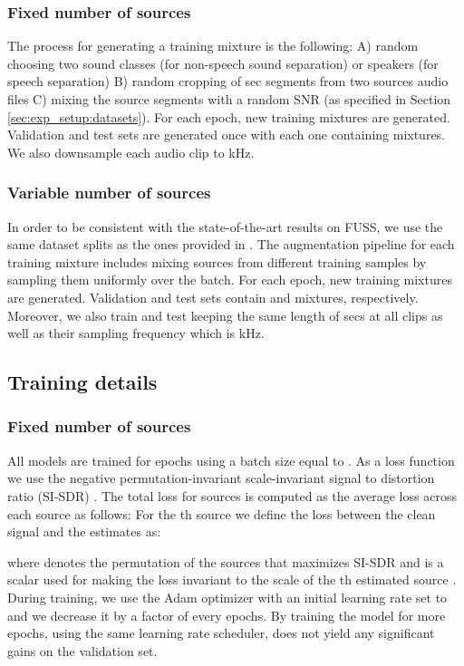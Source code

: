 \subsubsection{Fixed number of sources}
The process for generating a training mixture is the following: A) random choosing two sound classes (for non-speech sound separation) or speakers (for speech separation) B) random cropping of sec segments from two sources audio files C) mixing the source segments with a random SNR (as specified in Section \ref{sec:exp_setup:datasets}). For each epoch,  new training mixtures are generated. Validation and test sets are generated once with each one containing  mixtures. We also downsample each audio clip to kHz.

\subsubsection{Variable number of sources}
In order to be consistent with the state-of-the-art results on FUSS, we use the same dataset splits as the ones provided in \cite{wisdom2020FUSS}. The augmentation pipeline for each training mixture includes mixing sources from different training samples by sampling them uniformly over the batch. For each epoch,  new training mixtures are generated. Validation and test sets contain  and  mixtures, respectively. Moreover, we also train and test keeping the same length of secs at all clips as well as their sampling frequency which is kHz.

\subsection{Training details}
\label{sec:exp_setup:train}

\subsubsection{Fixed number of sources}
All models are trained for  epochs using a batch size equal to . As a loss function we use the negative permutation-invariant \cite{Yu2017PIT} scale-invariant signal to distortion ratio (SI-SDR) \cite{le2019sdr}. The total loss for  sources is computed as the average loss across each source as follows: For the th source we define the loss between the clean signal  and the estimates  as: 

where  denotes the permutation of the sources that maximizes SI-SDR and  is a scalar used for making the loss invariant to the scale of the th estimated source .  During training, we use the Adam optimizer \cite{adam} with an initial learning rate set to  and we decrease it by a 
factor of  every  epochs. By training the model for more epochs, using the same learning rate scheduler, does not yield any significant gains on the validation set. 

